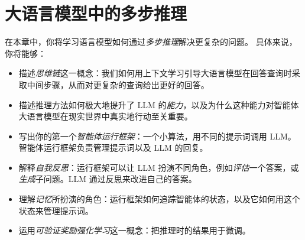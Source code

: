 \chapter{大语言模型中的多步推理}\label{chap:reasoning}


\begin{learningbox}
在本章中，你将学习语言模型如何通过{\em 多步推理}解决更复杂的问题。
具体来说，你将能够：
\begin{itemize}[leftmargin=*, nosep]
    \item 描述{\em 思维链}这一概念：我们如何用上下文学习引导大语言模型在回答查询时采取中间步骤，从而对更复杂的查询给出更好的回答。
    \item 描述推理方法如何极大地提升了 LLM 的{\em 能力}，以及为什么这种能力对智能体大语言模型在现实世界中真实地行动至关重要。
    \item 写出你的第一个{\em 智能体运行框架}：一个小算法，用不同的提示词调用 LLM。智能体运行框架负责管理提示词以及 LLM 的回复。
    \item 解释{\em 自我反思}：运行框架可以让 LLM 扮演不同角色，例如{\em 评估}一个答案，或{\em 生成}子问题。LLM 通过反思来改进自己的答案。
    \item 理解{\em 记忆}所扮演的角色：运行框架如何追踪智能体的状态，以及它如何用这个状态来管理提示词。
    \item 运用{\em 可验证奖励强化学习}这一概念：把推理时的结果用于微调。
\end{itemize}
\end{learningbox}


